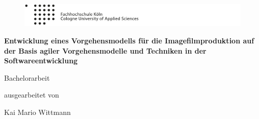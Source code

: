 \begin{titlepage}

\begin{center}

\begin{figure}[!ht]
	\centering
		\includegraphics[natwidth=920pt, natheight=95pt, width=1.0\textwidth]{images/logoheader.pdf}
\end{figure}

\vspace{0.8cm}

\begin{rmfamily}
\begin{huge}
\textbf{Entwicklung eines Vorgehensmodells für die Imagefilmproduktion auf der Basis agiler Vorgehensmodelle und Techniken in der Softwareentwicklung}\\	
\end{huge}
\vspace{0.5cm}
\end{rmfamily}

\vspace{1.6cm}



\begin{LARGE}
\begin{scshape}
Bachelorarbeit\\[0.8em]
\end{scshape}
\end{LARGE}

\begin{large}
ausgearbeitet von\\ 
\vspace{0.2cm}
\begin{LARGE}
Kai Mario Wittmann\\
\end{LARGE}
\end{large}


\end{center}
\end{titlepage}
